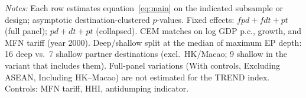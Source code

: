 \begin{threeparttable}
\begin{tabular}{lccc}
\bottomrule
\end{tabular}
\begin{tablenotes}\footnotesize
\item \emph{Notes:} Each row estimates equation~\eqref{eq:main} on the indicated subsample or design; asymptotic destination-clustered $p$-values. Fixed effects: $fpd + fdt + pt$ (full panel); $pd + dt + pt$ (collapsed). CEM matches on log GDP p.c., growth, and MFN tariff (year 2000). Deep/shallow split at the median of maximum EP depth: 16 deep vs.\ 7 shallow partner destinations (excl.\ HK/Macao; 9 shallow in the variant that includes them). Full-panel variations (With controls, Excluding ASEAN, Including HK--Macao) are not estimated for the TREND index. Controls: MFN tariff, HHI, antidumping indicator.
\end{tablenotes}
\end{threeparttable}
